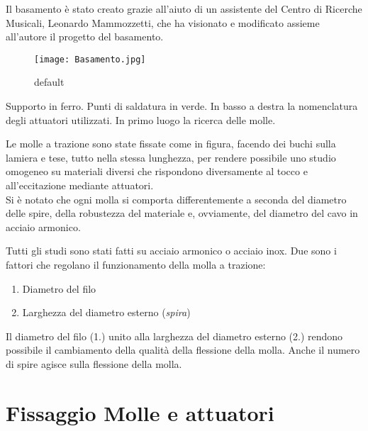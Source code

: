 Il basamento è stato creato grazie all'aiuto di un assistente del Centro di Ricerche Musicali, Leonardo Mammozzetti, che ha visionato e modificato assieme all'autore il progetto del basamento.


\begin{figure}[htbp]
\begin{center}
\texttt{[image: Basamento.jpg]}
\caption{default}
\label{default}
\end{center}
\end{figure}

Supporto in ferro. Punti di saldatura in verde. In basso a destra la nomenclatura degli attuatori utilizzati.
In primo luogo la ricerca delle molle.

Le molle a trazione sono state fissate come in figura, facendo dei buchi sulla lamiera e tese, tutto nella stessa lunghezza, per rendere possibile uno studio omogeneo su materiali diversi che rispondono diversamente al tocco e all'eccitazione mediante attuatori.\\
Si è notato che ogni molla si comporta differentemente a seconda del diametro delle spire, della robustezza del materiale e, ovviamente, del diametro del cavo in acciaio armonico.
%

Tutti gli studi sono stati fatti su acciaio armonico o acciaio inox. Due sono i fattori che regolano il funzionamento della molla a trazione:
\begin{enumerate}
\item{Diametro del filo}
\item{Larghezza del diametro esterno (\textit{spira})}
\end{enumerate}
Il diametro del filo (1.) unito alla larghezza del diametro esterno (2.) rendono possibile il cambiamento della qualità della flessione della molla. Anche il numero di spire agisce sulla flessione della molla.

\section{Fissaggio Molle e attuatori}

